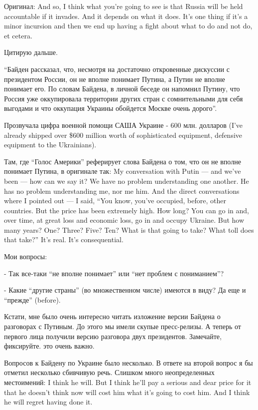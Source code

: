 Оригинал: And so, I think what you’re going to see is that Russia will be held
accountable if it invades.  And it depends on what it does.  It’s one thing if
it’s a minor incursion and then we end up having a fight about what to do and
not do, et cetera. 

Цитирую дальше. 

\enquote{Байден рассказал, что, несмотря на достаточно откровенные дискуссии с
президентом России, он не вполне понимает Путина, а Путин не вполне понимает
его. По словам Байдена, в личной беседе он напомнил Путину, что Россия уже
оккупировала территории других стран с сомнительными для себя выгодами и что
оккупация Украины обойдется Москве очень дорого}. 

Прозвучала  цифра военной помощи САША Украине - 600 млн. долларов (I’ve already
shipped over \$600 million worth of sophisticated equipment, defensive equipment
to the Ukrainians). 

Там, где \enquote{Голос Америки} реферирует слова Байдена о том, что он не вполне
понимает Путина, в оригинале так: My conversation with Putin — and we’ve been —
how can we say it?  We have no problem understanding one another.  He has no
problem understanding me, nor me him.  And the direct conversations where I
pointed out — I said, \enquote{You know, you’ve occupied, before, other countries.  But
the price has been extremely high.  How long?  You can go in and, over time, at
great loss and economic loss, go in and occupy Ukraine.  But how many years?
One?  Three?  Five?  Ten?  What is that going to take?  What toll does that
take?}  It’s real.  It’s consequential. 

Мои вопросы:

- Так все-таки \enquote{не вполне понимает} или \enquote{нет проблем с пониманием}? 

- Какие \enquote{другие страны} (во множественном числе) имеются в виду? Да еще и
\enquote{прежде} (before).  

Кстати, мне было очень интересно читать изложение версии Байдена о разговорах с
Путиным. До этого мы имели скупые пресс-релизы. А теперь от первого лица
получили версию разговора двух президентов. Замечайте, фиксируйте. это очень
важно. 

Вопросов к Байдену по Украине было несколько. В ответе на второй вопрос я бы
отметил несколько сбивчивую речь. Слишком много неопределенных местоимений: I
think he will.  But I think he’ll pay a serious and dear price for it that he
doesn’t think now will cost him what it’s going to cost him.  And I think he
will regret having done it. 


